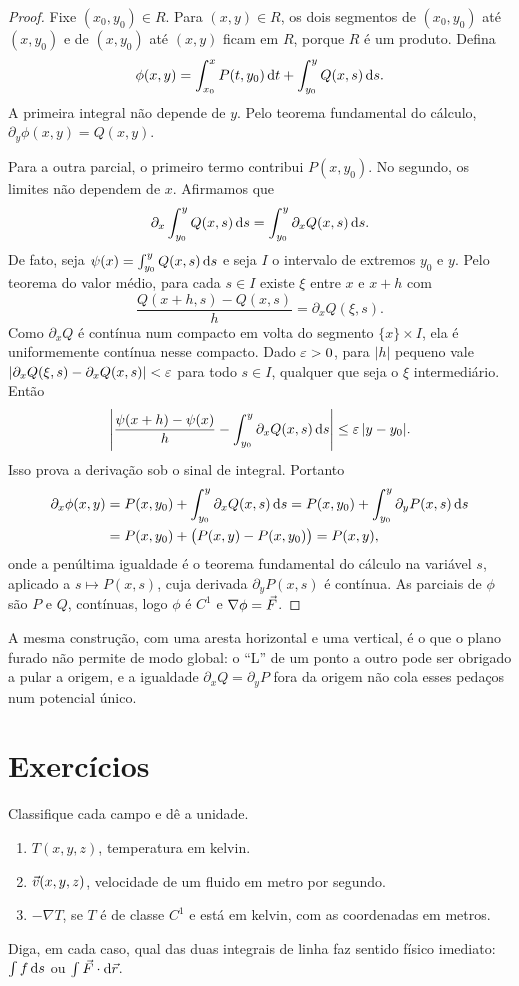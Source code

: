 \documentclass[11pt,a4paper]{article}
\begin{document}
\begin{proof}
Fixe $(x_0,y_0)\in R$. Para $(x,y)\in R$, os dois segmentos de $(x_0,y_0)$ até $(x,y_0)$ e de $(x,y_0)$ até $(x,y)$ ficam em $R$, porque $R$ é um produto. Defina
\[
\phi(x,y)
=\int_{x_0}^{x} P(t,y_0)\,\mathrm{d} t
+\int_{y_0}^{y} Q(x,s)\,\mathrm{d} s.
\]
A primeira integral não depende de $y$. Pelo teorema fundamental do cálculo, $\partial_y\phi(x,y)=Q(x,y)$.

Para a outra parcial, o primeiro termo contribui $P(x,y_0)$. No segundo, os limites não dependem de $x$. Afirmamos que
\[
\partial_x\int_{y_0}^{y} Q(x,s)\,\mathrm{d} s
=\int_{y_0}^{y}\partial_x Q(x,s)\,\mathrm{d} s.
\]
De fato, seja $\psi(x)=\int_{y_0}^{y} Q(x,s)\,\mathrm{d} s$ e seja $I$ o intervalo de extremos $y_0$ e $y$. Pelo teorema do valor médio, para cada $s\in I$ existe $\xi$ entre $x$ e $x+h$ com
\[
\frac{Q(x+h,s)-Q(x,s)}{h}=\partial_x Q(\xi,s).
\]
Como $\partial_x Q$ é contínua num compacto em volta do segmento $\{x\}\times I$, ela é uniformemente contínua nesse compacto. Dado $\varepsilon>0$, para $|h|$ pequeno vale $|\partial_x Q(\xi,s)-\partial_x Q(x,s)|<\varepsilon$ para todo $s\in I$, qualquer que seja o $\xi$ intermediário. Então
\[
\Biggl|\frac{\psi(x+h)-\psi(x)}{h}-\int_{y_0}^{y}\partial_x Q(x,s)\,\mathrm{d} s\Biggr|
\le\varepsilon\,|y-y_0|.
\]
Isso prova a derivação sob o sinal de integral. Portanto
\begin{align*}
\partial_x\phi(x,y)
&=P(x,y_0)+\int_{y_0}^{y}\partial_x Q(x,s)\,\mathrm{d} s
=P(x,y_0)+\int_{y_0}^{y}\partial_y P(x,s)\,\mathrm{d} s\\
&=P(x,y_0)+\bigl(P(x,y)-P(x,y_0)\bigr)
=P(x,y),
\end{align*}
onde a penúltima igualdade é o teorema fundamental do cálculo na variável $s$, aplicado a $s\mapsto P(x,s)$, cuja derivada $\partial_y P(x,s)$ é contínua. As parciais de $\phi$ são $P$ e $Q$, contínuas, logo $\phi$ é $C^1$ e $\nabla\phi=\vec{F}$.
\end{proof}

A mesma construção, com uma aresta horizontal e uma vertical, é o que o plano furado não permite de modo global: o ``L'' de um ponto a outro pode ser obrigado a pular a origem, e a igualdade $\partial_x Q=\partial_y P$ fora da origem não cola esses pedaços num potencial único.

\section{Exercícios}

\begin{exercicio}
Classifique cada campo e dê a unidade.
\begin{enumerate}
\item $T(x,y,z)$, temperatura em kelvin.
\item $\vec{v}(x,y,z)$, velocidade de um fluido em metro por segundo.
\item $-\nabla T$, se $T$ é de classe $C^1$ e está em kelvin, com as coordenadas em metros.
\end{enumerate}
Diga, em cada caso, qual das duas integrais de linha faz sentido físico imediato: $\int f\,\mathrm{d} s$ ou $\int\vec{F}\cdot\mathrm{d}\vec{r}$.
\end{exercicio}
\end{document}
